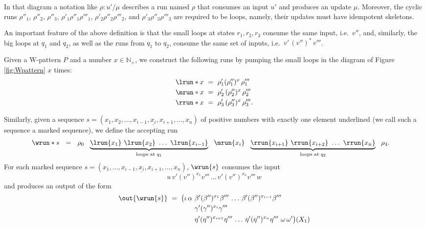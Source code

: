 \documentclass{article}
\providecommand{\AP}{}\NewDocumentCommand{\reintro}{o m}{#2}
\begin{document}
\begin{definition}
In that diagram a notation like $\rho: u'/\mu$ describes a run named $\rho$
that consumes an input $u'$ and produces an update $\mu$.
Moreover, the cyclic runs 
$\rho''_1$, 
$\rho''_2$,
$\rho''_3$,
$\rho'_1\rho''_1\rho'''_1$, 
$\rho'_2\rho''_2\rho'''_2$, and
$\rho'_3\rho''_3\rho'''_3$
are required to be loops, namely,
their updates must have idempotent skeletons.
\end{definition}

An important feature of the above definition is that 
the small loops at states $r_1,r_2,r_3$ consume the same input, 
i.e.~$v''$, and, similarly, the big loops at $q_1$ and $q_2$, 
as well as the runs from $q_1$ to $q_2$, consume the same set 
of inputs, i.e.~$v' \, (v'')^* \, v'''$. 

\AP
Given a W-pattern $P$ and a number $x \in \mathbb{N}_+$, 
we construct the following runs by pumping the small loops in the diagram of Figure \ref{fig:Wpattern} $x$ times:
\[
\begin{aligned}
	\lrun*{x}  &~=~ \rho'_1 (\rho''_1)^x \, \rho'''_1 \\
    \mrun*{x}   &~=~ \rho'_2 \, (\rho''_2)^x \, \rho'''_2 \\
    \rrun*{x} &~=~ \rho'_3 \, (\rho''_3)^x \, \rho'''_3.
\end{aligned}
\]
\AP
Similarly, %
given a sequence 
$s=(x_1,x_2,\dots,x_{i-1},\underline{x_i},x_{i+1},\dots,x_n)$ 
of positive numbers with exactly one element underlined 
(we call such a sequence a marked sequence), we define 
the accepting run  
\[
\begin{aligned}
	& \wrun*{s} ~~=~~ %
	\rho_0 ~~
    \underbrace{\lrun{x_1} ~ \lrun{x_2} ~\ldots~ \lrun{x_{i-1}}}_{\text{loops at $q_1$}} ~~
    \mrun{x_i} ~~
    \underbrace{\rrun{x_{i+1}} ~ \rrun{x_{i+2}} ~\ldots~ \rrun{x_n}}_{\text{loops at $q_2$}} 
    ~~ \rho_4.
\end{aligned}
\]
For each marked sequence 
$s=(x_1,\dots,x_{i-1},\underline{x_i},x_{i+1},\dots,x_n)$,
$\wrun{s}$ consumes the input   
\[
u \, v' (v'')^{x_1} v''' \, \dots \, 
      v' (v'')^{x_n} v''' \, 
 w
\]
and produces an output of the form
\[
\begin{aligned}
  \out{\wrun{s}} ~=~ 
  \big(\iota \, \alpha ~
  & \beta' (\beta'')^{x_1} \beta''' \,
  \dots \,
  \beta' (\beta'')^{x_{i-1}} \beta''' \,
  ~ \\
  & \gamma' (\gamma'')^{x_i} \gamma''' \,
  ~ \\
  & \eta' (\eta'')^{x_{i+1}} \eta''' \,
  \dots \,
  \eta' (\eta'')^{x_n} \eta'''
  ~ \omega \, \omega'\big)(X_1)
\end{aligned}
\]
\end{document}
